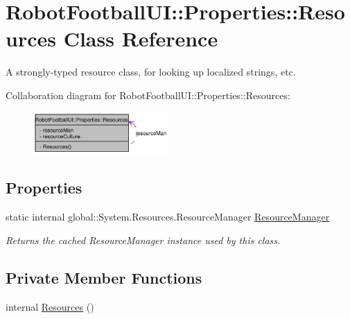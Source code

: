 \hypertarget{class_robot_football_u_i_1_1_properties_1_1_resources}{
\section{Robot\-Football\-UI::Properties::Resources Class Reference}
\label{class_robot_football_u_i_1_1_properties_1_1_resources}
}
A strongly-typed resource class, for looking up localized strings, etc.  


Collaboration diagram for Robot\-Football\-UI::Properties::Resources:\begin{figure}[H]
\begin{center}
\leavevmode
\includegraphics[width=145pt]{class_robot_football_u_i_1_1_properties_1_1_resources__coll__graph}
\end{center}
\end{figure}
\subsection*{Properties}
\begin{CompactItemize}
\item 
\hypertarget{class_robot_football_u_i_1_1_properties_1_1_resources_e1bb2e2ca2740b0484bef91f8348dfb1}{
static internal global::System.Resources.Resource\-Manager \hyperlink{class_robot_football_u_i_1_1_properties_1_1_resources_e1bb2e2ca2740b0484bef91f8348dfb1}{Resource\-Manager}}
\label{class_robot_football_u_i_1_1_properties_1_1_resources_e1bb2e2ca2740b0484bef91f8348dfb1}

\begin{CompactList}\small\item\em Returns the cached Resource\-Manager instance used by this class. \item\end{CompactList}\end{CompactItemize}
\subsection*{Private Member Functions}
\begin{CompactItemize}
\item 
\hypertarget{class_robot_football_u_i_1_1_properties_1_1_resources_b94a977039863e2fa23070083d6ef908}{
internal \hyperlink{class_robot_football_u_i_1_1_properties_1_1_resources_b94a977039863e2fa23070083d6ef908}{Resources} ()}
\label{class_robot_football_u_i_1_1_properties_1_1_resources_b94a977039863e2fa23070083d6ef908}

\end{CompactItemize}
